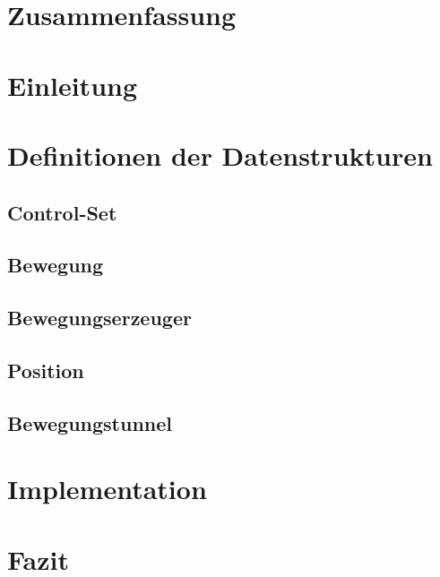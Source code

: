 \documentclass[11pt,a4paper,oneside]{article}
\begin{document}
\maketitle 
\pagebreak

\section*{Zusammenfassung}


\tableofcontents
\pagebreak

\section{Einleitung}

\pagebreak

\section{Definitionen der Datenstrukturen}

\subsection{ Control-Set}

\subsection{Bewegung}

\subsection{Bewegungserzeuger}

\subsection{Position}

\subsection{Bewegungstunnel}


\section{Implementation}


\section{ Fazit}

\end{document}
